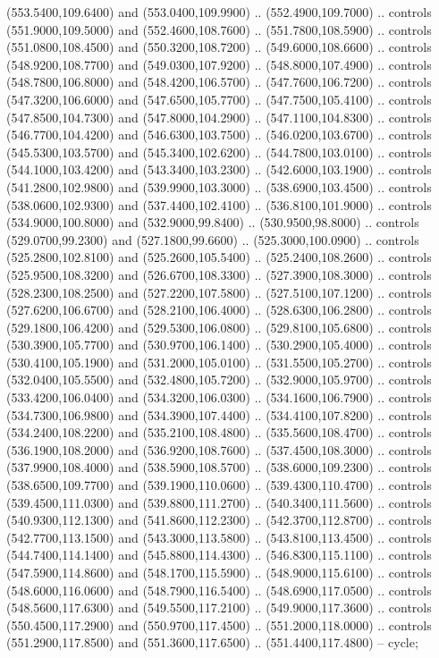 {\begin{scope}[y=0.80pt, x=0.80pt, yscale=-1, xscale=1, inner sep=0pt, outer sep=0pt, #1]
      (553.5400,109.6400) and (553.0400,109.9900) .. (552.4900,109.7000) .. controls
      (551.9000,109.5000) and (552.4600,108.7600) .. (551.7800,108.5900) .. controls
      (551.0800,108.4500) and (550.3200,108.7200) .. (549.6000,108.6600) .. controls
      (548.9200,108.7700) and (549.0300,107.9200) .. (548.8000,107.4900) .. controls
      (548.7800,106.8000) and (548.4200,106.5700) .. (547.7600,106.7200) .. controls
      (547.3200,106.6000) and (547.6500,105.7700) .. (547.7500,105.4100) .. controls
      (547.8500,104.7300) and (547.8000,104.2900) .. (547.1100,104.8300) .. controls
      (546.7700,104.4200) and (546.6300,103.7500) .. (546.0200,103.6700) .. controls
      (545.5300,103.5700) and (545.3400,102.6200) .. (544.7800,103.0100) .. controls
      (544.1000,103.4200) and (543.3400,103.2300) .. (542.6000,103.1900) .. controls
      (541.2800,102.9800) and (539.9900,103.3000) .. (538.6900,103.4500) .. controls
      (538.0600,102.9300) and (537.4400,102.4100) .. (536.8100,101.9000) .. controls
      (534.9000,100.8000) and (532.9000,99.8400) .. (530.9500,98.8000) .. controls
      (529.0700,99.2300) and (527.1800,99.6600) .. (525.3000,100.0900) .. controls
      (525.2800,102.8100) and (525.2600,105.5400) .. (525.2400,108.2600) .. controls
      (525.9500,108.3200) and (526.6700,108.3300) .. (527.3900,108.3000) .. controls
      (528.2300,108.2500) and (527.2200,107.5800) .. (527.5100,107.1200) .. controls
      (527.6200,106.6700) and (528.2100,106.4000) .. (528.6300,106.2800) .. controls
      (529.1800,106.4200) and (529.5300,106.0800) .. (529.8100,105.6800) .. controls
      (530.3900,105.7700) and (530.9700,106.1400) .. (530.2900,105.4000) .. controls
      (530.4100,105.1900) and (531.2000,105.0100) .. (531.5500,105.2700) .. controls
      (532.0400,105.5500) and (532.4800,105.7200) .. (532.9000,105.9700) .. controls
      (533.4200,106.0400) and (534.3200,106.0300) .. (534.1600,106.7900) .. controls
      (534.7300,106.9800) and (534.3900,107.4400) .. (534.4100,107.8200) .. controls
      (534.2400,108.2200) and (535.2100,108.4800) .. (535.5600,108.4700) .. controls
      (536.1900,108.2000) and (536.9200,108.7600) .. (537.4500,108.3000) .. controls
      (537.9900,108.4000) and (538.5900,108.5700) .. (538.6000,109.2300) .. controls
      (538.6500,109.7700) and (539.1900,110.0600) .. (539.4300,110.4700) .. controls
      (539.4500,111.0300) and (539.8800,111.2700) .. (540.3400,111.5600) .. controls
      (540.9300,112.1300) and (541.8600,112.2300) .. (542.3700,112.8700) .. controls
      (542.7700,113.1500) and (543.3000,113.5800) .. (543.8100,113.4500) .. controls
      (544.7400,114.1400) and (545.8800,114.4300) .. (546.8300,115.1100) .. controls
      (547.5900,114.8600) and (548.1700,115.5900) .. (548.9000,115.6100) .. controls
      (548.6000,116.0600) and (548.7900,116.5400) .. (548.6900,117.0500) .. controls
      (548.5600,117.6300) and (549.5500,117.2100) .. (549.9000,117.3600) .. controls
      (550.4500,117.2900) and (550.9700,117.4500) .. (551.2000,118.0000) .. controls
      (551.2900,117.8500) and (551.3600,117.6500) .. (551.4400,117.4800) -- cycle;


\end{scope}}
